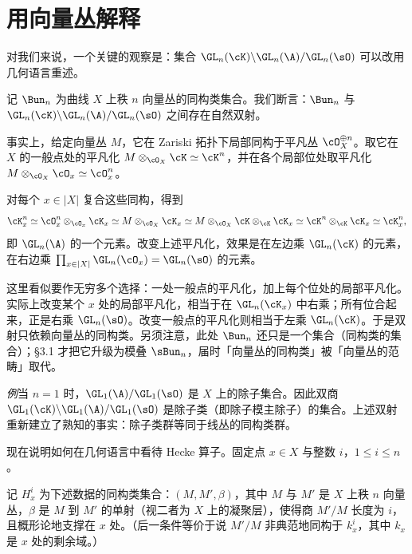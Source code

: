 \section{用向量丛解释}

对我们来说，一个关键的观察是：集合 $\GL_n(\cK)\backslash\GL_n(\A)/\GL_n(\sO)$ 可以改用几何语言重述。

记 $\Bun_n$ 为曲线 $X$ 上秩 $n$ 向量丛的同构类集合。我们断言：$\Bun_n$ 与 $\GL_n(\cK)\backslash\GL_n(\A)/\GL_n(\sO)$ 之间存在自然双射。

事实上，给定向量丛 $M$，它在 Zariski 拓扑下局部同构于平凡丛 $\cO_X^{\oplus n}$。取它在 $X$ 的一般点处的平凡化 $M\otimes_{\cO_X}\cK\simeq\cK^n$，并在各个局部位处取平凡化 $M\otimes_{\cO_X}\cO_x\simeq\cO_x^n$。

对每个 $x\in|X|$ 复合这些同构，得到
\[
\cK_x^n\simeq\cO_x^n\otimes_{\cO_x}\cK_x\simeq M\otimes_{\cO_X}\cK_x
\simeq M\otimes_{\cO_X}\cK\otimes_{\cK}\cK_x\simeq\cK^n\otimes_{\cK}\cK_x\simeq\cK_x^n,
\]
即 $\GL_n(\A)$ 的一个元素。改变上述平凡化，效果是在左边乘 $\GL_n(\cK)$ 的元素，在右边乘 $\prod_{x\in|X|}\GL_n(\cO_x)=\GL_n(\sO)$ 的元素。

\begin{annote}
这里看似要作无穷多个选择：一处一般点的平凡化，加上每个位处的局部平凡化。实际上改变某个 $x$ 处的局部平凡化，相当于在 $\GL_n(\cK_x)$ 中右乘；所有位合起来，正是右乘 $\GL_n(\sO)$。改变一般点的平凡化则相当于左乘 $\GL_n(\cK)$。于是双射只依赖向量丛的同构类。另须注意，此处 $\Bun_n$ 还只是一个集合（同构类的集合）；\S3.1 才把它升级为模叠 $\sBun_n$，届时「向量丛的同构类」被「向量丛的范畴」取代。\par\vspace{0.15em}{\raggedleft 【来源：原书 \S2.1、\S3.1（A）】\par}
\end{annote}

\emph{例}\quad 当 $n=1$ 时，$\GL_1(\A)/\GL_1(\sO)$ 是 $X$ 上的除子集合。因此双商 $\GL_1(\cK)\backslash\GL_1(\A)/\GL_1(\sO)$ 是除子类（即除子模主除子）的集合。上述双射重新建立了熟知的事实：除子类群等同于线丛的同构类群。

现在说明如何在几何语言中看待 Hecke 算子。固定点 $x\in X$ 与整数 $i$，$1\le i\le n$。

记 $H_x^i$ 为下述数据的同构类集合：$(M,M',\beta)$，其中 $M$ 与 $M'$ 是 $X$ 上秩 $n$ 向量丛，$\beta$ 是 $M$ 到 $M'$ 的单射（视二者为 $X$ 上的凝聚层），使得商 $M'/M$ 长度为 $i$，且概形论地支撑在 $x$ 处。（后一条件等价于说 $M'/M$ 非典范地同构于 $k_x^i$，其中 $k_x$ 是 $x$ 处的剩余域。）

